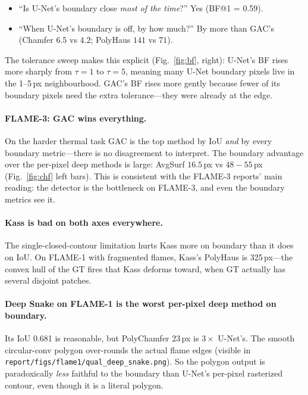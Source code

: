\documentclass[10pt]{article}
\begin{document}
\begin{itemize}
\setlength\itemsep{0pt}
\item ``Is U-Net's boundary close \emph{most of the time}?'' Yes (BF@1 = 0.59).
\item ``When U-Net's boundary is off, by how much?'' By more than GAC's (Chamfer
$6.5$ vs $4.2$; PolyHaus $141$ vs $71$).
\end{itemize}

The tolerance sweep makes this explicit (Fig.~\ref{fig:bf}, right): U-Net's BF
rises more sharply from $\tau{=}1$ to $\tau{=}5$, meaning many U-Net boundary
pixels live in the 1--5\,px neighbourhood. GAC's BF rises more gently because
fewer of its boundary pixels need the extra tolerance---they were already at
the edge.

\paragraph{FLAME-3: GAC wins everything.} On the harder thermal task GAC is
the top method by IoU \emph{and} by every boundary metric---there is no
disagreement to interpret. The boundary advantage over the per-pixel deep
methods is large: AvgSurf $16.5\,$px vs $48{-}55\,$px (Fig.~\ref{fig:chf}
left bars). This is consistent with the FLAME-3 reports' main reading: the
detector is the bottleneck on FLAME-3, and even the boundary metrics see it.

\paragraph{Kass is bad on both axes everywhere.} The single-closed-contour
limitation hurts Kass more on boundary than it does on IoU. On FLAME-1 with
fragmented flames, Kass's PolyHaus is 325\,px---the convex hull of the GT
fires that Kass deforms toward, when GT actually has several disjoint
patches.

\paragraph{Deep Snake on FLAME-1 is the worst per-pixel deep method on
boundary.} Its IoU 0.681 is reasonable, but PolyChamfer 23\,px is
$3\times$ U-Net's. The smooth circular-conv polygon over-rounds the actual
flame edges (visible in \texttt{report/figs/flame1/qual\_deep\_snake.png}).
So the polygon output is paradoxically \emph{less} faithful to the boundary
than U-Net's per-pixel rasterized contour, even though it is a literal
polygon.
\end{document}
